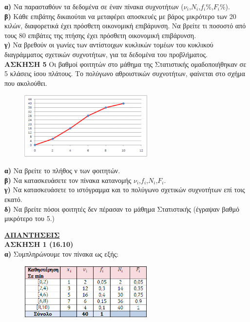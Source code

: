 \documentclass[11pt,a4paper]{article}
\begin{document}
\textbf{α) }Να παρασταθόυν τα δεδομένα σε έναν πίνακα συχνοτήτων ($ν_i$,$N_i$,$f_i$\%,$F_i$\%).\\
\textbf{β)} Κάθε επιβάτης δικαιούται να μεταφέρει αποσκευές με βάρος μικρότερο των 20 κιλών, διαφορετικά έχει πρόσθετη οικονομική επιβάρυνση. Να βρείτε τι ποσοστό από τους 80 επιβάτες της πτήσης έχει πρόσθετη οικονομική επιβάρυνση.\\
\textbf{γ)} Να βρεθούν οι γωνίες των αντίστοιχων κυκλικών τομέων του κυκλικού διαγράμματος σχετικών συχνοτήτων, για τα δεδομένα του προβλήματος.\\


\textbf{ΑΣΚΗΣΗ 5 }Οι βαθμοί φοιτητών στο μάθημα της Στατιστικής ομαδοποιήθηκαν σε 5 κλάσεις ίσου πλάτους. Το πολύγωνο αθροιστικών συχνοτήτων, φαίνεται στο σχήμα που ακολούθει.

\begin{figure}[hbtp]
\begin{center}
\includegraphics[width=0.6\textwidth, scale=0.5]{5.eps}
\end{center}
\end{figure}

\textbf{α) }Να βρείτε το πλήθος ν των φοιτητών.\\
\textbf{β) }Να κατασκευάσετε τον πίνακα κατανομής $ν_i$,$f_i$,$N_i$,$F_i$.\\
\textbf{γ) }Να κατασκευάσετε το ιστόγραμμα και το πολύγωνο σχετικών συχνοτήτων επί τοις εκατό.\\
{\small \textbf{δ) }Να βρείτε πόσοι φοιτητές δεν πέρασαν το μάθημα Στατιστικής (έγραψαν βαθμό μικρότερο του 5.)\\}

\underline{\textbf{ΑΠΑΝΤΗΣΕΙΣ}}\\
\textbf{ΑΣΚΗΣΗ 1 (16.10) \\
α)} Συμπληρώνουμε τον πίνακα ως εξής:\\

\begin{figure}[hbtp]
\includegraphics[width=0.6\textwidth, scale=0.5]{A1.eps}
\end{figure}
\end{document}
